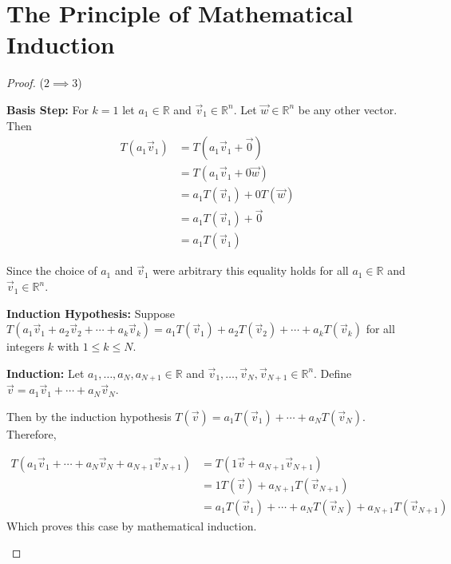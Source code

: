 \section{The Principle of Mathematical Induction}

\lineartransformationequivalences*

\begin{proof} ($2 \implies 3$)
\begin{inparaenum}
\item[\textbf{Basis Step:}] For $k=1$ let $a_1 \in \mathbb{R}$ and
$\vec{v}_1 \in \mathbb{R}^n$. Let $\vec{w} \in \mathbb{R}^n$ be any other
vector. Then
\begin{align*}
T(a_1\vec{v}_1)&=T(a_1\vec{v}_1+\vec{0})\\
&=T(a_1\vec{v}_1+0\vec{w})\\
&=a_1T(\vec{v}_1)+0T(\vec{w})\\
&=a_1T(\vec{v}_1)+\vec{0}\\
&=a_1T(\vec{v}_1)
\end{align*}

Since the choice of $a_1$ and $\vec{v}_1$ were arbitrary this equality holds
for all $a_1 \in \mathbb{R}$ and $\vec{v}_1 \in \mathbb{R}^n$.\\[10pt]
%                                                                                                                                                                       
\item[\textbf{Induction Hypothesis: }] Suppose \\
$T(a_1\vec{v}_1+a_2\vec{v}_2+\cdots+a_k\vec{v}_k)=                                                                                                                      
a_1T(\vec{v}_1)+a_2T(\vec{v}_2)+\cdots+a_kT(\vec{v}_k)$ for all integers $k$
with $1 \le k \le N$. \\[10pt]
%                                                                                                                                                                       
\item[\textbf{Induction: }]Let $a_1, \ldots, a_N,a_{N+1} \in \mathbb{R}$ and
$\vec{v}_1,\ldots,\vec{v}_N,\vec{v}_{N+1} \in \mathbb{R}^n$. Define
$\vec{v}=a_1\vec{v}_1+\cdots+a_N\vec{v}_N$.

Then by the induction hypothesis $T(\vec{v})=a_1T(\vec{v}_1)+\cdots+a_NT(\vec{v}_N)$. Therefore,

\begin{align*}
T(a_1\vec{v}_1+\cdots+a_N\vec{v}_N+a_{N+1}\vec{v}_{N+1})
&=T(1\vec{v}+a_{N+1}\vec{v}_{N+1})\\
&=1T(\vec{v})+a_{N+1}T(\vec{v}_{N+1})\\
&=a_1T(\vec{v}_1)+\cdots+a_NT(\vec{v}_N)+a_{N+1}T(\vec{v}_{N+1})
\end{align*}
Which proves this case by mathematical induction.
\end{inparaenum}
\end{proof}
